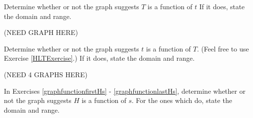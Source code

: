 \documentclass{ximera}
\begin{document}
\begin{problem}\label{graphfunctionlasttT}
    Determine whether or not the graph suggests $T$ is a function of $t$  If it does, state the domain and range.

    (NEED GRAPH HERE)
\end{problem} 






\begin{problem}
    Determine whether or not the graph suggests $t$ is a function of $T$.  (Feel free to use Exercise \ref{HLTExercise}.)  If it does, state the domain and range.

    (NEED 4 GRAPHS HERE)
\end{problem}





In Exercises \ref{graphfunctionfirstHs} - \ref{graphfunctionlastHs}, determine whether or not the graph suggests $H$ is a function of $s$.  For the ones which do, state the domain and range. 
\end{document}
